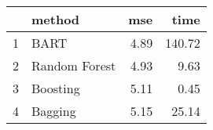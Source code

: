 \begin{table}[ht]
\centering
\begin{tabular}{rlrr}
  \hline
 & method & mse & time \\ 
  \hline
1 & BART & 4.89 & 140.72 \\ 
  2 & Random Forest & 4.93 & 9.63 \\ 
  3 & Boosting & 5.11 & 0.45 \\ 
  4 & Bagging & 5.15 & 25.14 \\ 
   \hline
\end{tabular}
\end{table}
